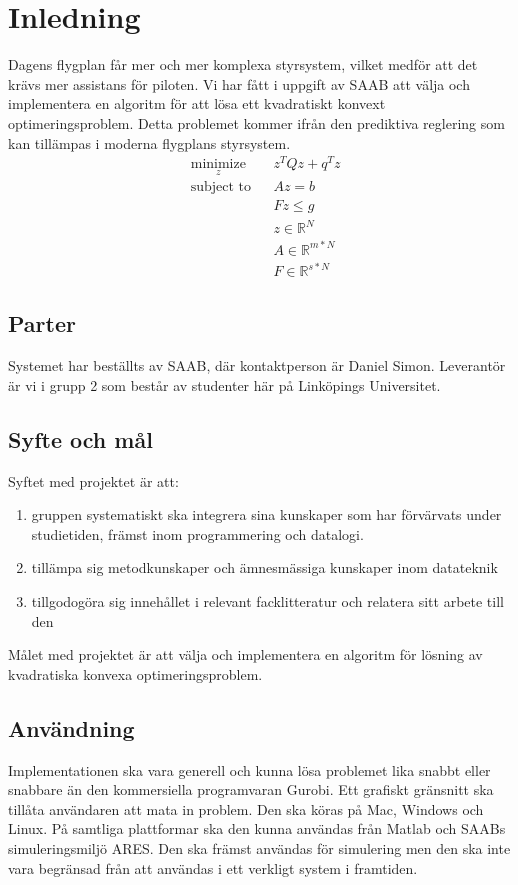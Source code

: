 \section{Inledning}
Dagens flygplan får mer och mer komplexa styrsystem, vilket medför att det krävs mer assistans för piloten. Vi har fått i uppgift av SAAB att välja och implementera en algoritm för att lösa ett kvadratiskt konvext optimeringsproblem. Detta problemet kommer ifrån den prediktiva reglering som kan tillämpas i moderna flygplans styrsystem.
\begin{equation*}
\begin{aligned}
& \underset{z}{\text{minimize}}
& & z^{T}Qz+q^{T}z \\
& \text{subject to}
& & Az=b \\
& & & Fz \leq g \\
& && z \in \mathbb{R}^N \\
& && A \in \mathbb{R}^{m*N}\\
& && F \in \mathbb{R}^{s*N}
\end{aligned}
\end{equation*}
\subsection{Parter}
Systemet har beställts av SAAB, där kontaktperson är Daniel Simon. Leverantör är vi i grupp 2 som består av studenter här på Linköpings Universitet.

\subsection{Syfte och mål}
Syftet med projektet är att:
\begin{enumerate}
 \item gruppen systematiskt ska integrera sina kunskaper som har förvärvats under studietiden, främst inom programmering och datalogi. 
 \item tillämpa sig  metodkunskaper och ämnesmässiga kunskaper inom datateknik
 \item tillgodogöra sig innehållet i relevant facklitteratur och relatera sitt arbete till den
\end{enumerate}

Målet med projektet är att välja och implementera en algoritm för lösning av kvadratiska konvexa optimeringsproblem.

\subsection{Användning}
Implementationen ska vara generell och kunna lösa problemet lika snabbt eller snabbare än den kommersiella programvaran Gurobi. Ett grafiskt gränsnitt ska tillåta användaren att mata in problem. Den ska köras på Mac, Windows och Linux. På samtliga plattformar ska den kunna användas från Matlab och SAABs simuleringsmiljö ARES. Den ska främst användas för simulering men den ska inte vara begränsad från att användas i ett verkligt system i framtiden. 

